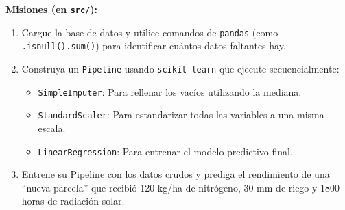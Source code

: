\documentclass[12pt,a4paper]{article}
\begin{document}
\textbf{Misiones (en \texttt{src/}):}
\begin{enumerate}[label=\alph*)]
    \item Cargue la base de datos y utilice comandos de \texttt{pandas} (como \texttt{.isnull().sum()}) para identificar cuántos datos faltantes hay.
    \item Construya un \texttt{Pipeline} usando \texttt{scikit-learn} que ejecute secuencialmente:
    \begin{itemize}
        \item \texttt{SimpleImputer}: Para rellenar los vacíos utilizando la mediana.
        \item \texttt{StandardScaler}: Para estandarizar todas las variables a una misma escala.
        \item \texttt{LinearRegression}: Para entrenar el modelo predictivo final.
    \end{itemize}
    \item Entrene su Pipeline con los datos crudos y prediga el rendimiento de una ``nueva parcela'' que recibió 120 kg/ha de nitrógeno, 30 mm de riego y 1800 horas de radiación solar.
\end{enumerate}
\end{document}

